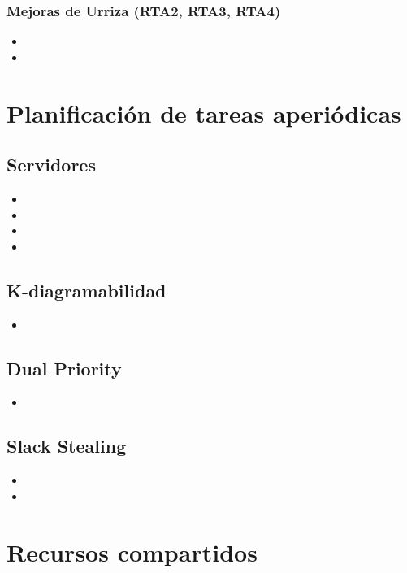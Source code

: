 \documentclass{article}
\begin{document}
\subsubsection*{Mejoras de Urriza (RTA2, RTA3, RTA4)}
\begin{itemize}
    \item {}
    \item {}
\end{itemize}  

\section{Planificación de tareas aperiódicas}
\subsection*{Servidores}
\begin{itemize}
    \item {}
    \item {}
    \item {}
    \item {}
\end{itemize}
\subsection*{K-diagramabilidad}
\begin{itemize}
    \item {}
\end{itemize}
\subsection*{Dual Priority}
\begin{itemize}
    \item {}
\end{itemize}
\subsection*{Slack Stealing}
\begin{itemize}
    \item {}
    \item {}
\end{itemize}

\section{Recursos compartidos}
\end{document}
